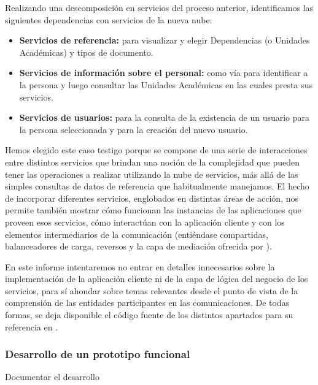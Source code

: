 Realizando una descomposición en servicios del proceso anterior, identificamos las siguientes dependencias con servicios de la nueva nube:

\begin{itemize}
  \item \textbf{Servicios de referencia:} para visualizar y elegir Dependencias (o Unidades Académicas) y tipos de documento.
  \item \textbf{Servicios de información sobre el personal:} como vía para identificar a la persona y luego consultar las Unidades Académicas en las cuales presta sus servicios.
  \item \textbf{Servicios de usuarios:} para la consulta de la existencia de un usuario para la persona seleccionada y para la creación del nuevo usuario.
\end{itemize}



Hemos elegido este caso testigo porque se compone de una serie de interacciones entre distintos servicios que brindan una noción de la complejidad que pueden tener las operaciones a realizar utilizando la nube de servicios, más allá de las simples consultas de datos de referencia que habitualmente manejamos. El hecho de incorporar diferentes servicios, englobados en distintas áreas de acción, nos permite también mostrar cómo funcionan las instancias de las aplicaciones que proveen esos servicios, cómo interactúan con la aplicación cliente y con los elementos intermediarios de la comunicación (entiéndase  compartidas, balanceadores de carga,  reversos y la capa de mediación ofrecida por ).

En este informe intentaremos no entrar en detalles innecesarios sobre la implementación de la aplicación cliente ni de la capa de lógica del negocio de los servicios, para sí ahondar sobre temas relevantes desde el punto de vista de la comprensión de las entidades participantes en las comunicaciones. De todas formas, se deja disponible el código fuente de los distintos apartados para su referencia en .


\subsubsection{Desarrollo de un prototipo funcional}

Documentar el desarrollo
